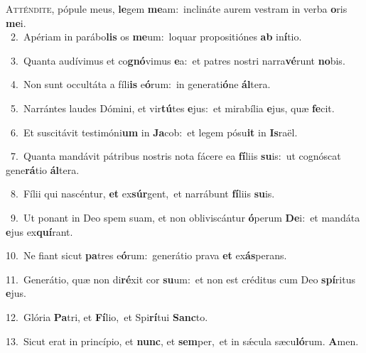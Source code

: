 \lettrine{\initial\textcolor{\initialcolor}{A}}{tténdite,} pópule meus, \textbf{le}\-gem \textbf{me}\-am:~\star inclináte aurem vestram in verba \textbf{o}\-ris \textbf{me}\-i.\\
{\numbfont\textcolor{\numbcolor}{~2.}}~Apériam in parábo\textbf{lis} os \textbf{me}\-um:~\star loquar propositiónes \textbf{ab} in\-\textbf{í}\-tio.\par
{\numbfont\textcolor{\numbcolor}{~3.}}~Quanta audívimus et co\-\textbf{gnó}\-vimus \textbf{e}\-a:~\star et patres nostri narra\-\textbf{vé}\-runt \textbf{no}\-bis.\par
{\numbfont\textcolor{\numbcolor}{~4.}}~Non sunt occultáta a fíli\textbf{is} e\-\textbf{ó}\-rum:~\star in generati\-\textbf{ó}\-ne \textbf{ál}\-tera.\par
{\numbfont\textcolor{\numbcolor}{~5.}}~Narrántes laudes Dómini, et vir\-\textbf{tú}\-tes \textbf{e}\-jus:~\star et mirabília \textbf{e}\-jus, quæ \textbf{fe}\-cit.\par
{\numbfont\textcolor{\numbcolor}{~6.}}~Et suscitávit testimóni\textbf{um} in \textbf{Ja}\-cob:~\star et legem pósu\textbf{it} in \textbf{Is}\-raël.\par
{\numbfont\textcolor{\numbcolor}{~7.}}~Quanta mandávit pátribus nostris nota fácere ea \textbf{fí}\-liis \textbf{su}\-is:~\star ut cognóscat gene\-\textbf{rá}\-tio \textbf{ál}\-tera.\par
{\numbfont\textcolor{\numbcolor}{~8.}}~Fílii qui nascéntur, \textbf{et} ex\-\textbf{súr}\-gent,~\star et narrábunt \textbf{fí}\-liis \textbf{su}\-is.\par
{\numbfont\textcolor{\numbcolor}{~9.}}~Ut ponant in Deo spem suam, et non obliviscántur \textbf{ó}\-perum \textbf{De}\-i:~\star et mandáta \textbf{e}\-jus ex\-\textbf{quí}\-rant.\par
{\numbfont\textcolor{\numbcolor}{10.}}~Ne fiant sicut \textbf{pa}\-tres e\-\textbf{ó}\-rum:~\star generátio prava \textbf{et} ex\-\textbf{ás}\-perans.\par
{\numbfont\textcolor{\numbcolor}{11.}}~Generátio, quæ non di\-\textbf{ré}\-xit cor \textbf{su}\-um:~\star et non est créditus cum Deo \textbf{spí}\-ritus \textbf{e}\-jus.\par
{\numbfont\textcolor{\numbcolor}{12.}}~Glória \textbf{Pa}\-tri, et \textbf{Fí}\-lio,~\star et Spi\-\textbf{rí}\-tui \textbf{Sanc}\-to.\par
{\numbfont\textcolor{\numbcolor}{13.}}~Sicut erat in princípio, et \textbf{nunc}\-, et \textbf{sem}\-per,~\star et in sǽcula sæcu\-\textbf{ló}\-rum. \textbf{A}\-men.\par
